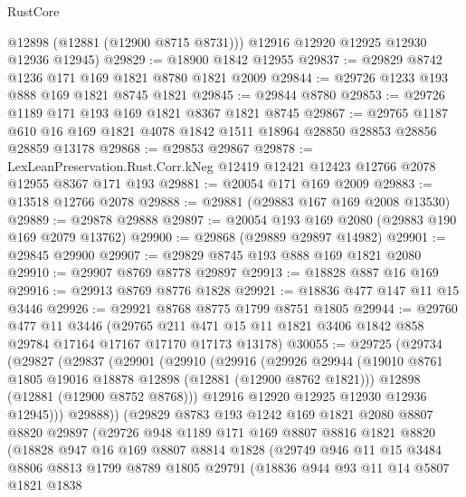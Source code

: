 \begin{lexlean}{RustCore}
\begin{coremodule}
        @12898
        (@12881 (@12900 @8715 @8731)))
      @12916
      @12920
      @12925
      @12930
      @12936
      @12945)
@29829 := @18900 @1842 @12955
@29837 := @29829 @8742 @1236 @171 @169 @1821 @8780 @1821 @2009
@29844 := @29726 @1233 @193 @888 @169 @1821 @8745 @1821
@29845 := @29844 @8780
@29853 := @29726 @1189 @171 @193 @169 @1821 @8367 @1821 @8745
@29867 := @29765
    @1187
    @610
    @16
    @169
    @1821
    @4078
    @1842
    @1511
    @18964
    @28850
    @28853
    @28856
    @28859
    @13178
@29868 := @29853 @29867
@29878 := LexLeanPreservation.Rust.Corr.kNeg
    @12419
    @12421
    @12423
    @12766
    @2078
    @12955
    @8367
    @171
    @193
@29881 := @20054 @171 @169 @2009
@29883 := @13518 @12766 @2078
@29888 := @29881 (@29883 @167 @169 @2008 @13530)
@29889 := @29878 @29888
@29897 := @20054 @193 @169 @2080 (@29883 @190 @169 @2079 @13762)
@29900 := @29868 (@29889 @29897 @14982)
@29901 := @29845 @29900
@29907 := @29829 @8745 @193 @888 @169 @1821 @2080
@29910 := @29907 @8769 @8778 @29897
@29913 := @18828 @887 @16 @169
@29916 := @29913 @8769 @8776 @1828
@29921 := @18836 @477 @147 @11 @15 @3446
@29926 := @29921 @8768 @8775 @1799 @8751 @1805
@29944 := @29760
    @477
    @11
    @3446
    (@29765 @211 @471 @15 @11 @1821 @3406 @1842 @858 @29784 @17164 @17167 @17170 @17173 @13178)
@30055 := @29725
    (@29734
      (@29827
        (@29837
          (@29901
            (@29910
              (@29916
                (@29926
                  @29944
                  (@19010 @8761 @1805 @19016 @18878 @12898 (@12881 (@12900 @8762 @1821)))
                  @12898
                  (@12881 (@12900 @8752 @8768)))
                @12916
                @12920
                @12925
                @12930
                @12936
                @12945)))
          @29888))
      (@29829
        @8783
        @193
        @1242
        @169
        @1821
        @2080
        @8807
        @8820
        @29897
        (@29726
          @948
          @1189
          @171
          @169
          @8807
          @8816
          @1821
          @8820
          (@18828
            @947
            @16
            @169
            @8807
            @8814
            @1828
            (@29749
              @946
              @11
              @15
              @3484
              @8806
              @8813
              @1799
              @8789
              @1805
              @29791
              (@18836
                @944
                @93
                @11
                @14
                @5807
                @1821
                @1838

\end{coremodule}
\end{lexlean}
